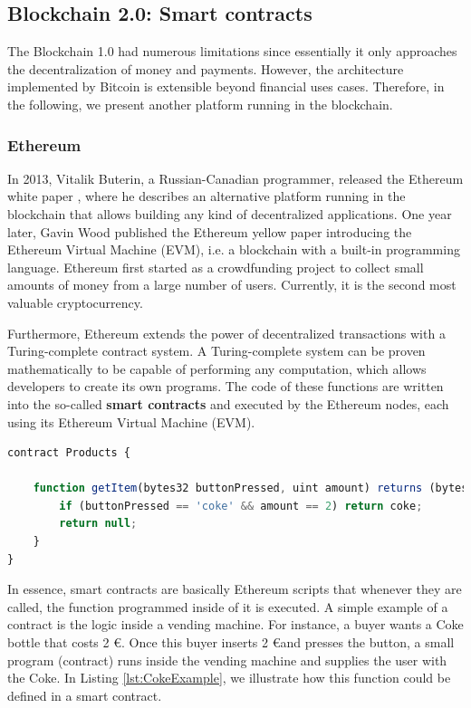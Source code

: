 \subsection{Blockchain 2.0: Smart contracts} \label{smartContracts}

The Blockchain 1.0 had numerous limitations since essentially it only approaches the decentralization of money and payments. However, the architecture implemented by Bitcoin is extensible beyond financial uses cases. Therefore, in the following, we present another platform running in the blockchain.

\subsubsection{Ethereum}

In 2013, Vitalik Buterin, a Russian-Canadian programmer, released the Ethereum white paper \cite{buterin2014next}, where he describes an alternative platform running in the blockchain that allows building any kind of decentralized applications. One year later, Gavin Wood published the Ethereum yellow paper introducing the Ethereum Virtual Machine (EVM), i.e. a blockchain with a built-in programming language. Ethereum first started as a crowdfunding project to collect small amounts of money from a large number of users. Currently, it is the second most valuable cryptocurrency.

Furthermore, Ethereum extends the power of decentralized transactions with a Turing-complete contract system. A Turing-complete system can be proven mathematically to be capable of performing any computation, which allows developers to create its own programs. The code of these functions are written into the so-called \textbf{smart contracts} and executed by the Ethereum nodes, each using its Ethereum Virtual Machine (EVM).

\begin{lstlisting}[language=JavaScript,caption={Example of an Ethereum contract simulating a vending machine. The defined function returns a bottle of Coke if 2 \euro are inserted.},label={lst:CokeExample}]
contract Products {

	function getItem(bytes32 buttonPressed, uint amount) returns (bytes32 item) {
		if (buttonPressed == 'coke' && amount == 2) return coke;
 		return null;
	}
}
\end{lstlisting}

In essence, smart contracts are basically Ethereum scripts that whenever they are called, the function programmed inside of it is executed. A simple example of a contract is the logic inside a vending machine. For instance, a buyer wants a Coke bottle that costs 2 \euro. Once this buyer inserts 2 \euro and presses the button, a small program (contract) runs inside the vending machine and supplies the user with the Coke. In Listing \ref{lst:CokeExample}, we illustrate how this function could be defined in a smart contract.

